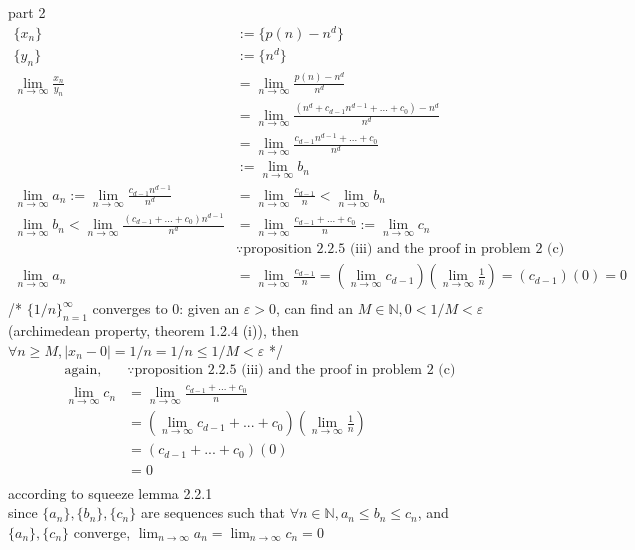\documentclass[12pt, border = 4pt, multi]{article} %
\begin{document}
part 2
\begin{align*}
\{x_n\} &:= \{p(n) - n ^ d\}\\
\{y_n\} &:= \{n ^ d\}\\
\lim_{n \rightarrow \infty} \frac{x_n}{y_n} &= \lim_{n \rightarrow \infty} \frac{p(n) - n ^ d}{n ^ d}\\
&= \lim_{n \rightarrow \infty} \frac{(n ^ d + c_{d - 1} n ^ {d - 1} + ... + c_0) - n ^ d}{n ^ d}\\
&= \lim_{n \rightarrow \infty} \frac{c_{d - 1} n ^ {d - 1} + ... + c_0}{n ^ d}\\
&:= \lim_{n \rightarrow \infty} b_n\\
\lim_{n \rightarrow \infty} a_n := \lim_{n \rightarrow \infty} \frac{c_{d - 1} n ^ {d - 1}}{n ^ d} &= \lim_{n \rightarrow \infty} \frac{c_{d - 1}}{n} < \lim_{n \rightarrow \infty} b_n\\
\lim_{n \rightarrow \infty} b_n < \lim_{n \rightarrow \infty} \frac{(c_{d - 1} + ... + c_0)n ^ {d - 1}}{n ^ d} &= \lim_{n \rightarrow \infty} \frac{c_{d - 1} + ... + c_0}{n} := \lim_{n \rightarrow \infty} c_n\\
&\because \text{proposition 2.2.5 (iii) and the proof in problem 2 (c)}\\
\lim_{n \rightarrow \infty} a_n &= \lim_{n \rightarrow \infty}\frac{c_{d - 1}}{n} = \left(\lim_{n \rightarrow \infty}c_{d - 1}\right)\left(\lim_{n \rightarrow \infty}\frac{1}{n}\right) = (c_{d - 1})(0) = 0\\
\end{align*}
/* $\{1 / n\}_{n = 1} ^ {\infty}$ converges to 0: given an $\varepsilon > 0$, can find an $M \in \mathbb{N}, 0 < 1 / M < \varepsilon$ (archimedean property, theorem 1.2.4 (i)), then $\forall n \geq M, |x_n - 0| = 1 / n = 1 / n \leq 1 / M < \varepsilon$ */
\begin{align*}
\text{again, } &\because \text{proposition 2.2.5 (iii) and the proof in problem 2 (c)}\\
\lim_{n \rightarrow \infty} c_n &= \lim_{n \rightarrow \infty} \frac{c_{d - 1} + ... + c_0}{n}\\
&= \left(\lim_{n \rightarrow \infty} c_{d - 1} + ... + c_0\right)\left(\lim_{n \rightarrow \infty}\frac{1}{n}\right)\\
&= (c_{d - 1} + ... + c_0)(0)\\
&= 0\\
\end{align*}
according to squeeze lemma 2.2.1\\
since $\{a_n\}, \{b_n\}, \{c_n\}$ are sequences such that $\forall n \in \mathbb{N}, a_n \leq b_n \leq c_n$, and $\{a_n\}, \{c_n\}$ converge, $\lim_{n \rightarrow \infty} a_n = \lim_{n \rightarrow \infty} c_n = 0$\\
\end{document}
